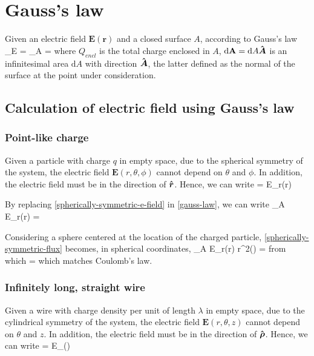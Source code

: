 
\chapter{Gauss's law}
Given an electric field $\mathbf{E}(\mathbf{r})$ and a closed surface $A$, according to Gauss's law
\be\label{gauss-law}
\Phi_E = \oiint_A  \cdot {} =
\ee
where $Q_{encl}$ is the total charge enclosed in $A$, $\mathrm{d}\mathbf{A}=\mathrm{d}A\boldsymbol{\hat{\textbf{$A$}}}$ is an infinitesimal area $\mathrm{d}A$ with direction $\boldsymbol{\hat{\textbf{$A$}}}$, the latter defined as the normal of the surface at the point under consideration.

\section{Calculation of electric field using Gauss's law}
\subsection{Point-like charge}
Given a particle with charge $q$ in empty space, due to the spherical symmetry of the system, the electric field $\mathbf{E}(r,\theta,\phi)$ cannot depend on $\theta$ and $\phi$. In addition, the electric field must be in the direction of $\boldsymbol{\hat{\textbf{$r$}}}$. Hence, we can write
\be\label{spherically-symmetric-e-field}
 = E_r(r) \cdot {}
\ee

By replacing \ref{spherically-symmetric-e-field} in \ref{gauss-law}, we can write
\be\label{spherically-symmetric-flux}
\oiint_A E_r(r) \cdot {} \cdot {} =
\ee

Considering a sphere centered at the location of the charged particle, \ref{spherically-symmetric-flux} becomes, in spherical coordinates,
\be\label{spherically-symmetric-flux-2}
\oiint_A E_r(r) \cdot {} \cdot r^{2}\sin(\phi)\theta{}\phi{} =
\ee
from which
\be
{}=
\ee
which matches Coulomb's law.


\subsection{Infinitely long, straight wire}


Given a wire with charge density per unit of length $\lambda$ in empty space, due to the cylindrical symmetry of the system, the electric field $\mathbf{E}(r,\theta,z)$ cannot depend on $\theta$ and $z$. In addition, the electric field must be in the direction of $\boldsymbol{\hat{\textbf{$\rho$}}}$. Hence, we can write
\be\label{cylindrically-symmetric-e-field}
 = E_{\rho}(\rho) \cdot \uvec{\rho}
\ee

